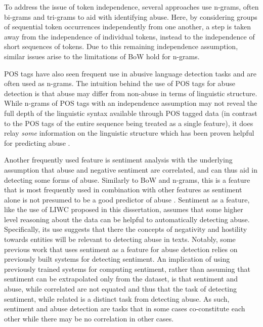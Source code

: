 To address the issue of token independence, several approaches use n-grams, often bi-grams \citep{Waseem:2016} and tri-grams \citep{Davidson:2017} to aid with identifying abuse. Here, by considering groups of sequential token occurrences independently from one another, a step is taken away from the independence of individual tokens, instead to the independence of short sequences of tokens. Due to this remaining independence assumption, similar issues arise to the limitations of BoW hold for n-grams.

POS tags have also seen frequent use in abusive language detection tasks \citep{Fortuna:2018} and are often used as n-grams. The intuition behind the use of POS tags for abuse detection is that abuse may differ from non-abuse in terms of linguistic structure. While n-grams of POS tags with an independence assumption may not reveal the full depth of the linguistic syntax available through POS tagged data (in contrast to the POS tags of the entire sequence being treated as a single feature), it does relay \textit{some} information on the linguistic structure which has been proven helpful for predicting abuse \citep{Fortuna:2018}.

Another frequently used feature is sentiment analysis \citep{Fortuna:2018} with the underlying assumption that abuse and negative sentiment are correlated, and can thus aid in detecting some forms of abuse. Similarly to BoW and n-grams, this is a feature that is most frequently used in combination with other features as sentiment alone is not presumed to be a good predictor of abuse \citep{Fortuna:2018}. Sentiment as a feature, like the use of LIWC proposed in this dissertation, assumes that some higher level reasoning about the data can be helpful to automatically detecting abuse. Specifically, its use suggests that there the concepts of negativity and hostility towards entities will be relevant to detecting abuse in texts. Notably, some previous work that uses sentiment as a feature for abuse detection \citep{Davidson:2017} relies on previously built systems for detecting sentiment. An implication of using previously trained systems for computing sentiment, rather than assuming that sentiment can be extrapolated only from the dataset, is that sentiment and abuse, while correlated are not equated and thus that the task of detecting sentiment, while related is a distinct task from detecting abuse. As such, sentiment and abuse detection are tasks that in some cases co-constitute each other while there may be no correlation in other cases.

